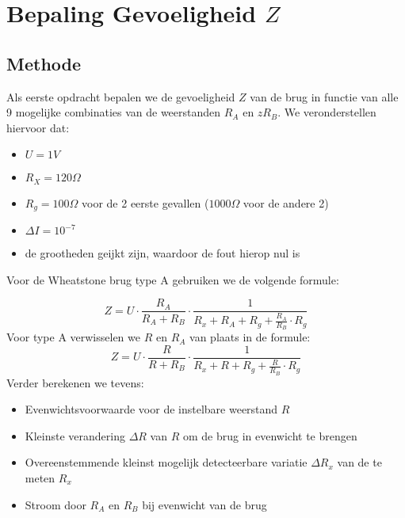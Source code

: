 \section{Bepaling Gevoeligheid $Z$}
\subsection{Methode}
Als eerste opdracht bepalen we de gevoeligheid $Z$ van de brug in functie van alle 9 mogelijke combinaties
van de weerstanden $R_A$ en $zR_B$. We veronderstellen hiervoor dat:
\begin{itemize}
    \item $U = 1 V$
    \item $R_X = 120 \Omega$
    \item $R_g = 100 \Omega$ voor de 2 eerste gevallen ($1000 \Omega$ voor de andere 2)
    \item $\Delta I = 10^{-7}$
    \item de grootheden geijkt zijn, waardoor de fout hierop nul is
\end{itemize}

Voor de Wheatstone brug type A gebruiken we de volgende formule:


\begin{equation}
    Z = U \cdot \frac{R_A}{R_A + R_B} \cdot \frac{1}{R_x + R_A + R_g + \frac{R_A}{R_B}\cdot R_g}
\end{equation}
Voor type A verwisselen we $R$ en $R_A$ van plaats in de formule:
\begin{equation}
    Z = U \cdot \frac{R}{R + R_B} \cdot \frac{1}{R_x + R + R_g + \frac{R}{R_B}\cdot R_g}
\end{equation}
Verder berekenen we tevens:
\begin{itemize}
    \item Evenwichtsvoorwaarde voor de instelbare weerstand $R$
    \item Kleinste verandering $\Delta R$ van $R$ om de brug in evenwicht te brengen
    \item Overeenstemmende kleinst mogelijk detecteerbare variatie $\Delta R_x$ van de te meten $R_x$ 
    \item Stroom door $R_A$ en $R_B$ bij evenwicht van de brug
\end{itemize}

